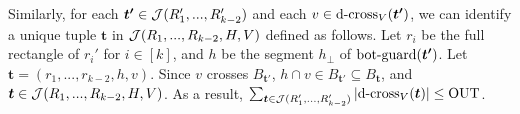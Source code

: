\vgap

Similarly, for each $\textrm{\boldmath${t'}$}\in  \mathcal{J}(R_1',...,R_{k-2}')$ and each $v \in \mathrm{d\text{-}cross}_V(\textrm{\boldmath${t'}$})$, we can identify a unique tuple $\bm{t}$ in $\mathcal{J}(R_1,...,R_{k-2},H,V)$ defined as follows. Let $r_i$ be the full rectangle of $r_i'$ for $i \in [k]$, and $h$ be the segment $h_\bot$ of $\mathrm{bot\text{-}guard}(\textrm{\boldmath${t'}$})$. Let $\bm{t} = (r_1,...,r_{k-2},h,v)$. Since $v$ crosses $B_{\bm{t'}}$, $h\cap v \in B_{\bm{t'}} \subseteq B_{\bm{t}}$, and $\textrm{\boldmath${t}$}\in \mathcal{J}(R_1,...,R_{k-2},H,V)$. As a result, $\sum_{\textrm{\boldmath${t}$}\in \mathcal{J}(R_1',...,R_{k-2}')}  |\mathrm{d\text{-}cross}_V(\textrm{\boldmath${t}$})| \leq \mathrm{OUT}$.
